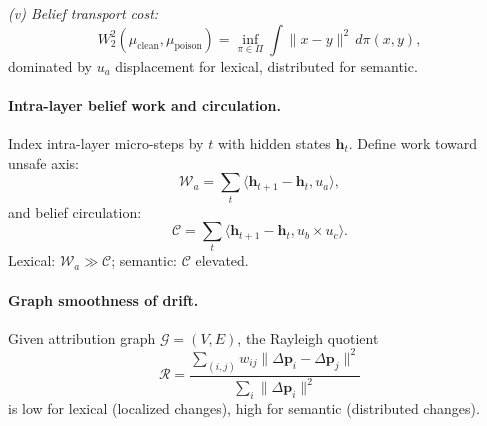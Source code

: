 \documentclass[11pt]{article}
\begin{document}
\noindent\textit{(v) Belief transport cost:}
\[
W_2^2(\mu_{\mathrm{clean}}, \mu_{\mathrm{poison}}) = \inf_{\pi\in\Pi} \int \|x-y\|^2 \, d\pi(x,y),
\]
dominated by $u_a$ displacement for lexical, distributed for semantic.

\paragraph{Intra-layer belief work and circulation.}
Index intra-layer micro-steps by $t$ with hidden states $\mathbf{h}_t$. Define work toward unsafe axis:
\[
\mathcal{W}_a = \sum_{t} \langle \mathbf{h}_{t+1}-\mathbf{h}_t, u_a \rangle,
\]
and belief circulation:
\[
\mathcal{C} = \sum_{t} \langle \mathbf{h}_{t+1}-\mathbf{h}_t, u_b \times u_c \rangle.
\]
Lexical: $\mathcal{W}_a \gg \mathcal{C}$; semantic: $\mathcal{C}$ elevated.

\paragraph{Graph smoothness of drift.}
Given attribution graph $\mathcal{G}=(V,E)$, the Rayleigh quotient
\[
\mathcal{R} = \frac{\sum_{(i,j)} w_{ij} \|\Delta \mathbf{p}_i - \Delta \mathbf{p}_j\|^2}{\sum_i \|\Delta \mathbf{p}_i\|^2}
\]
is low for lexical (localized changes), high for semantic (distributed changes).
\end{document}
